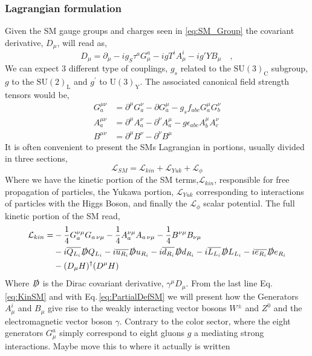 \subsubsection{Lagrangian formulation }
%
Given the SM gauge groups and charges seen in \ref{eq:SM_Group} the covariant derivative, $D_\mu$, will read as, 
%
\begin{equation}
\label{eq:PartialDefSM}
D_\mu = \partial_\mu - i g_S \tau^a G^a_\mu - i g T^i A^i_\mu - i g' Y B_\mu \quad ,  
\end{equation}  
%
We can expect 3 different type of couplings, $g_s$ related to the $\mathrm{SU(3)_C}$ subgroup, $g$ to the $\mathrm{SU(2)_L}$ and $g^\prime$ to $\mathrm{U(3)_Y}$. The associated canonical field strength tensors would be,
\begin{align}
G_a^{\mu \nu} & = \partial^\mu G^\nu_a - \partial G^\mu_a - g_s f_{abc} G_a^\mu G_b^\nu  \\ 
A_a^{\mu \nu} & = \partial^\mu A^\nu_a - \partial^\nu A^\mu_a  - g \epsilon_{abc} A^\mu_b A^\nu_c \\
B^{\mu \nu}   & = \partial^\mu B^\nu - \partial^\nu B^\mu 
\end{align}
It is often convenient to present the SMs Lagrangian in portions, usually divided in three sections,
\begin{equation}
\mathcal{L}_{SM} = \mathcal{L}_{kin}  +  \mathcal{L}_{Yuk} +  \mathcal{L}_{\phi} 	
\end{equation}
Where we have the kinetic portion of the SM terms,$\mathcal{L}_{kin}$, responsible for  free propagation of particles, the Yukawa portion, $\mathcal{L}_{Yuk}$  corresponding to interactions of particles with the Higgs Boson, and finally the $\mathcal{L}_{\phi}$ scalar potential. The full kinetic portion of the SM read, 
%
\begin{align}
\label{eq:KinSM}
\mathcal{L}_{kin} = & - \frac{1}{4} G^{\nu \mu}_a G_{a \,\nu \mu}  - \frac{1}{4}  A^{\nu \mu}_a A_{a \,\nu \mu}  
- \frac{1}{4}  B^{\nu \mu} B_{\nu \mu} \nonumber \\ 
 & -i \overline{Q_{L_i}} \slashed{D} Q_{L_i} 
   -i \overline{u_{R_i}} \slashed{D} u_{R_i}  
   -i \overline{d_{R_i}} \slashed{D} d_{R_i}  
   -i \overline{L_{L_i}} \slashed{D} L_{L_i}    
   -i \overline{e_{R_i}} \slashed{D} e_{R_i}   \\
 & - (D_\mu H)^\dagger ( D^\mu H )   \nonumber 
\end{align}
Where $\slashed{D}$ is the Dirac covariant derivative, $\gamma^\mu D_\mu$. { \color{gray} From the last line Eq.\,\ref{eq:KinSM} and with Eq.\,\ref{eq:PartialDefSM} we will present how the Generators $A^i_\mu$ and $B_\mu$ give rise to the weakly interacting vector bosons $W^\pm$ and $Z^0$ and the electromagnetic vector boson $\gamma$. Contrary to the color sector, where the eight generators $G^a_\mu$ simply correspond to eight gluons $g$ a mediating strong interactions. } { \color{blue} Maybe move this to where it actually is written } 

